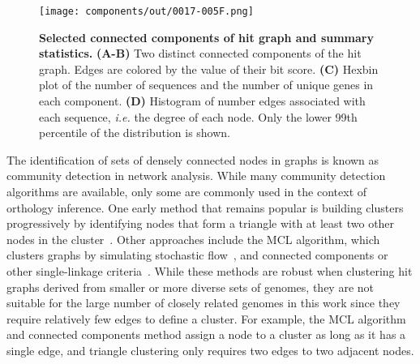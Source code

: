 \begin{figure}[h!]
\texttt{[image: components/out/0017-005F.png]}
\centering
\caption{\textbf{Selected connected components of hit graph and summary statistics.}
\textbf{(A-B)} Two distinct connected components of the hit graph. Edges are colored by the value of their bit score. \textbf{(C)} Hexbin plot of the number of sequences and the number of unique genes in each component. \textbf{(D)} Histogram of number edges associated with each sequence, \textit{i.e.} the degree of each node. Only the lower 99th percentile of the distribution is shown.}
\label{fig:components}
\end{figure}

The identification of sets of densely connected nodes in graphs is known as community detection in network analysis. While many community detection algorithms are available, only some are commonly used in the context of orthology inference. One early method that remains popular is building clusters progressively by identifying nodes that form a triangle with at least two other nodes in the cluster~\cite{Tatusov1997, Jensen2007}. Other approaches include the MCL algorithm, which clusters graphs by simulating stochastic flow~\cite{Enright2002, Li2003, Emms2015}, and connected components or other single-linkage criteria~\cite{Remm2001, Linard2011, Train2017, Cosentino2018}. While these methods are robust when clustering hit graphs derived from smaller or more diverse sets of genomes, they are not suitable for the large number of closely related genomes in this work since they require relatively few edges to define a cluster. For example, the MCL algorithm and connected components method assign a node to a cluster as long as it has a single edge, and triangle clustering only requires two edges to two adjacent nodes.

